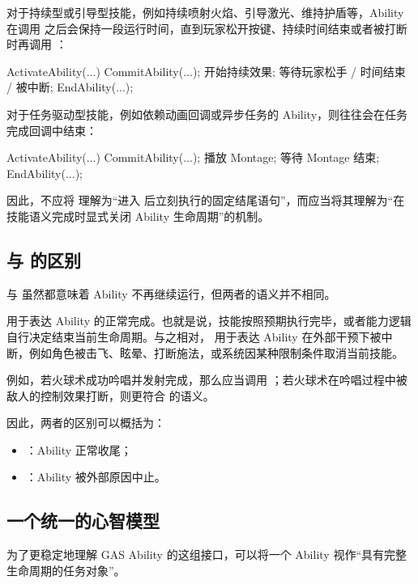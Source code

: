 对于持续型或引导型技能，例如持续喷射火焰、引导激光、维持护盾等，Ability 在调用  之后会保持一段运行时间，直到玩家松开按键、持续时间结束或者被打断时再调用 ：

\begin{code}
	ActivateAbility(...)
	{
		CommitAbility(...);
		开始持续效果;
		等待玩家松手 / 时间结束 / 被中断;
		EndAbility(...);
	}
\end{code}

对于任务驱动型技能，例如依赖动画回调或异步任务的 Ability，则往往会在任务完成回调中结束：

\begin{code}
	ActivateAbility(...)
	{
		CommitAbility(...);
		播放 Montage;
		等待 Montage 结束;
		EndAbility(...);
	}
\end{code}

因此，不应将  理解为“进入  后立刻执行的固定结尾语句”，而应当将其理解为“在技能语义完成时显式关闭 Ability 生命周期”的机制。

\subsection{ 与  的区别}

 与  虽然都意味着 Ability 不再继续运行，但两者的语义并不相同。

 用于表达 Ability 的正常完成。也就是说，技能按照预期执行完毕，或者能力逻辑自行决定结束当前生命周期。与之相对， 用于表达 Ability 在外部干预下被中断，例如角色被击飞、眩晕、打断施法，或系统因某种限制条件取消当前技能。

例如，若火球术成功吟唱并发射完成，那么应当调用 ；若火球术在吟唱过程中被敌人的控制效果打断，则更符合  的语义。

因此，两者的区别可以概括为：

\begin{itemize}
	\item {}：Ability 正常收尾；
	\item {}：Ability 被外部原因中止。
\end{itemize}

\subsection{一个统一的心智模型}

为了更稳定地理解 GAS Ability 的这组接口，可以将一个 Ability 视作“具有完整生命周期的任务对象”。

